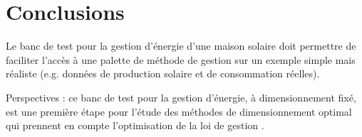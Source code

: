 \documentclass[a4paper,10pt,twocolumn]{article}
\begin{document}
% 
% 


\section{Conclusions}

Le banc de test pour la gestion d'énergie d'une maison solaire
doit permettre de faciliter l'accès à une palette de méthode de gestion
sur un exemple simple mais réaliste (e.g. données de production solaire et de consommation réelles).

Perspectives : ce banc de test pour la gestion d'énergie,
à dimensionnement fixé, est une première étape pour l'étude des méthodes
de dimensionnement optimal qui prennent en compte l'optimisation de la loi de gestion
\cite{Haessig:2014:SGE}.




\end{document}
